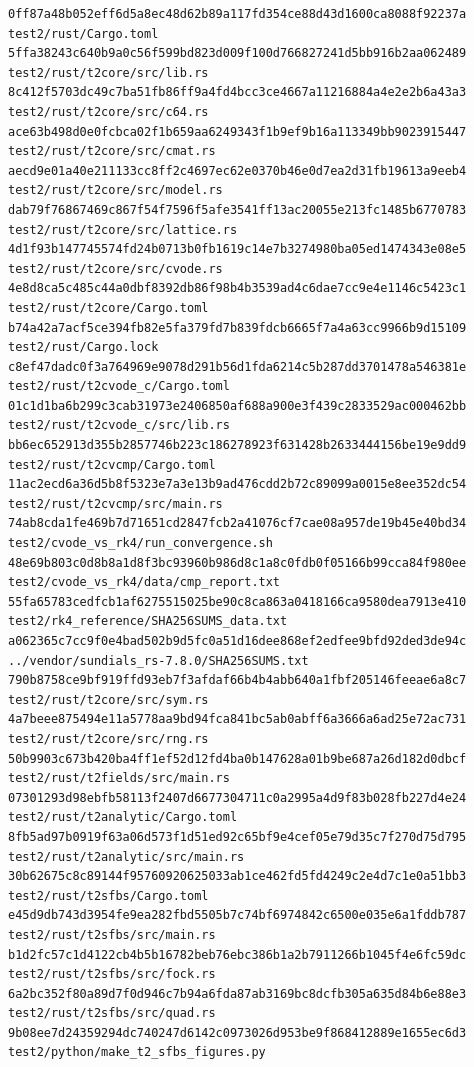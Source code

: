 \documentclass[
  10pt,
]{article}
\begin{document}
\begin{verbatim}
0ff87a48b052eff6d5a8ec48d62b89a117fd354ce88d43d1600ca8088f92237a  test2/rust/Cargo.toml
5ffa38243c640b9a0c56f599bd823d009f100d766827241d5bb916b2aa062489  test2/rust/t2core/src/lib.rs
8c412f5703dc49c7ba51fb86ff9a4fd4bcc3ce4667a11216884a4e2e2b6a43a3  test2/rust/t2core/src/c64.rs
ace63b498d0e0fcbca02f1b659aa6249343f1b9ef9b16a113349bb9023915447  test2/rust/t2core/src/cmat.rs
aecd9e01a40e211133cc8ff2c4697ec62e0370b46e0d7ea2d31fb19613a9eeb4  test2/rust/t2core/src/model.rs
dab79f76867469c867f54f7596f5afe3541ff13ac20055e213fc1485b6770783  test2/rust/t2core/src/lattice.rs
4d1f93b147745574fd24b0713b0fb1619c14e7b3274980ba05ed1474343e08e5  test2/rust/t2core/src/cvode.rs
4e8d8ca5c485c44a0dbf8392db86f98b4b3539ad4c6dae7cc9e4e1146c5423c1  test2/rust/t2core/Cargo.toml
b74a42a7acf5ce394fb82e5fa379fd7b839fdcb6665f7a4a63cc9966b9d15109  test2/rust/Cargo.lock
c8ef47dadc0f3a764969e9078d291b56d1fda6214c5b287dd3701478a546381e  test2/rust/t2cvode_c/Cargo.toml
01c1d1ba6b299c3cab31973e2406850af688a900e3f439c2833529ac000462bb  test2/rust/t2cvode_c/src/lib.rs
bb6ec652913d355b2857746b223c186278923f631428b2633444156be19e9dd9  test2/rust/t2cvcmp/Cargo.toml
11ac2ecd6a36d5b8f5323e7a3e13b9ad476cdd2b72c89099a0015e8ee352dc54  test2/rust/t2cvcmp/src/main.rs
74ab8cda1fe469b7d71651cd2847fcb2a41076cf7cae08a957de19b45e40bd34  test2/cvode_vs_rk4/run_convergence.sh
48e69b803c0d8b8a1d8f3bc93960b986d8c1a8c0fdb0f05166b99cca84f980ee  test2/cvode_vs_rk4/data/cmp_report.txt
55fa65783cedfcb1af6275515025be90c8ca863a0418166ca9580dea7913e410  test2/rk4_reference/SHA256SUMS_data.txt
a062365c7cc9f0e4bad502b9d5fc0a51d16dee868ef2edfee9bfd92ded3de94c  ../vendor/sundials_rs-7.8.0/SHA256SUMS.txt
790b8758ce9bf919ffd93eb7f3afdaf66b4b4abb640a1fbf205146feeae6a8c7  test2/rust/t2core/src/sym.rs
4a7beee875494e11a5778aa9bd94fca841bc5ab0abff6a3666a6ad25e72ac731  test2/rust/t2core/src/rng.rs
50b9903c673b420ba4ff1ef52d12fd4ba0b147628a01b9be687a26d182d0dbcf  test2/rust/t2fields/src/main.rs
07301293d98ebfb58113f2407d6677304711c0a2995a4d9f83b028fb227d4e24  test2/rust/t2analytic/Cargo.toml
8fb5ad97b0919f63a06d573f1d51ed92c65bf9e4cef05e79d35c7f270d75d795  test2/rust/t2analytic/src/main.rs
30b62675c8c89144f95760920625033ab1ce462fd5fd4249c2e4d7c1e0a51bb3  test2/rust/t2sfbs/Cargo.toml
e45d9db743d3954fe9ea282fbd5505b7c74bf6974842c6500e035e6a1fddb787  test2/rust/t2sfbs/src/main.rs
b1d2fc57c1d4122cb4b5b16782beb76ebc386b1a2b7911266b1045f4e6fc59dc  test2/rust/t2sfbs/src/fock.rs
6a2bc352f80a89d7f0d946c7b94a6fda87ab3169bc8dcfb305a635d84b6e88e3  test2/rust/t2sfbs/src/quad.rs
9b08ee7d24359294dc740247d6142c0973026d953be9f868412889e1655ec6d3  test2/python/make_t2_sfbs_figures.py

\end{verbatim}
\end{document}
